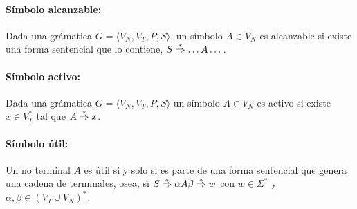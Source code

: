 \paragraph{Símbolo alcanzable:} Dada una grámatica \(G=\langle V_N, V_T, P, S\rangle\), un símbolo \(A\in V_N\) es alcanzable si existe una forma sentencial que lo contiene,  \(S\overset{*}{\Rightarrow} \dots A\dots\).

\paragraph{Símbolo activo:} Dada una grámatica \(G =\langle V_N, V_T, P, S\rangle\) un símbolo \(A\in V_N\) es activo si existe \(x\in V_T^*\) tal que \(A\overset{*}{\Rightarrow} x\).

\paragraph{Símbolo útil:} Un no terminal \(A\) es útil si y solo si es parte de una forma sentencial que genera una cadena de terminales, osea, si \(S\overset{*}{\Rightarrow} \alpha A\beta \overset{*}{\Rightarrow} w\) con \(w \in \Sigma^*\) y \(\alpha, \beta \in (V_T\cup V_N)^*\).